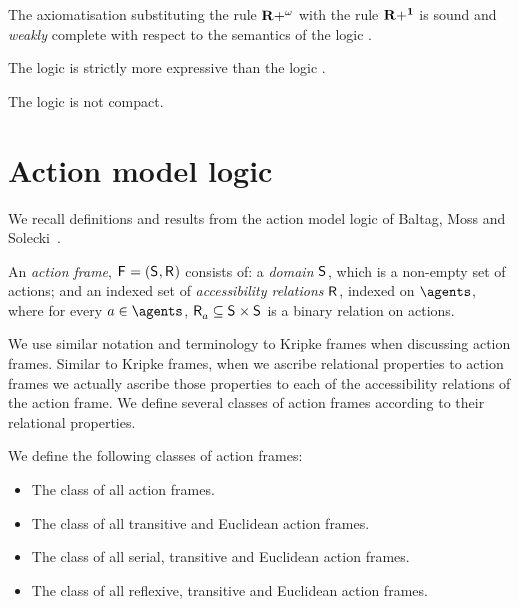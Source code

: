 \begin{proposition}
The axiomatisation \axiomApalS{} substituting the rule ${\bf R+^\omega}$ with the rule ${\bf R+^1}$ is sound and {\em weakly} complete with respect to the semantics of the logic \logicApalS{}.
\end{proposition}

\begin{proposition}
The logic \logicApalS{} is strictly more expressive than the logic \logicPalS{}.
\end{proposition}

\begin{proposition}
The logic \logicApalS{} is not compact.
\end{proposition}

\section{Action model logic}\label{aml}

We recall definitions and results from the action model logic of Baltag, Moss and Solecki~\cite{baltagetal:1998,baltagetal:2004}.

\begin{definition}
An {\em action frame}, $\aFrameAndTuple$ consists of:
a {\em domain} $\aStates$, which is a non-empty set of actions; and
an indexed set of {\em accessibility relations} $\aAccessibilityRel$, indexed on $\agents$, where for every $\agentA \in \agents$, $\aAccessibilityA \subseteq \aStates \times \aStates$ is a binary relation on actions.
\end{definition}

We use similar notation and terminology to Kripke frames when discussing action frames.
Similar to Kripke frames, when we ascribe relational properties to action frames we actually ascribe those properties to each of the accessibility relations of the action frame.
We define several classes of action frames according to their relational properties.

\begin{definition}
We define the following classes of action frames:
\begin{itemize}
    \item The class \classAmK{} of all action frames.
    \item The class \classAmKFF{} of all transitive and Euclidean action frames.
    \item The class \classAmKD{} of all serial, transitive and Euclidean action frames.
    \item The class \classAmS{} of all reflexive, transitive and Euclidean action frames.
\end{itemize}
\end{definition}

